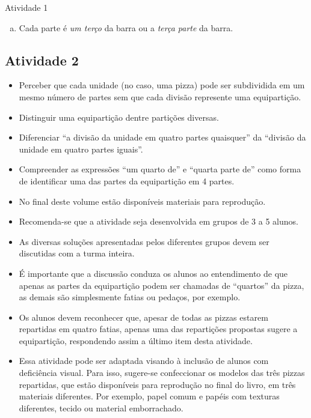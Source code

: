 \begin{multicols}{2}
\begin{resposta*}{Atividade 1}
\begin{enumerate}[a),wide,labelindent=0pt]
    \item       Cada parte é {\it um terço} da barra ou a {\it terça parte} da barra.
\end{enumerate} %
\end{resposta*}

\subsection{Atividade 2}

   \vspace{.1cm}

\begin{itemize} %
    \item       Perceber que cada unidade (no caso, uma pizza) pode ser subdividida em um mesmo número de partes sem que cada divisão represente uma equipartição.
    \item       Distinguir uma equipartição dentre partições diversas.
    \item       Diferenciar       ``a divisão da unidade em quatro partes quaisquer'' da       ``divisão da unidade em quatro partes iguais''.
    \item       Compreender as expressões ``um quarto de'' e ``quarta parte de'' como forma de identificar uma das partes da equipartição em 4 partes.
\end{itemize} %
 \vspace{.1cm}

   \vspace{.1cm}

  \begin{itemize} %
    \item No final deste volume estão disponíveis materiais para reprodução.
    \item Recomenda-se que a atividade seja desenvolvida em grupos de 3 a 5 alunos.
    \item As diversas soluções apresentadas pelos diferentes grupos devem ser discutidas com a turma inteira.
    \item É importante que a discussão conduza os alunos ao entendimento de que apenas as partes da equipartição podem ser chamadas de ``quartos'' da pizza, as demais são simplesmente fatias ou pedaços, por exemplo.
    \item Os alunos devem reconhecer que, apesar de todas as pizzas estarem repartidas em quatro fatias, apenas uma das repartições propostas sugere a equipartição, respondendo assim a último item desta atividade.
    \item       Essa atividade pode ser adaptada visando à inclusão de alunos com deficiência visual. Para isso, sugere-se confeccionar os modelos das três pizzas repartidas, que estão disponíveis para reprodução no final do livro, em três materiais diferentes. Por exemplo, papel comum e papéis com texturas diferentes, tecido ou material emborrachado.
\end{itemize} %



\end{multicols}
